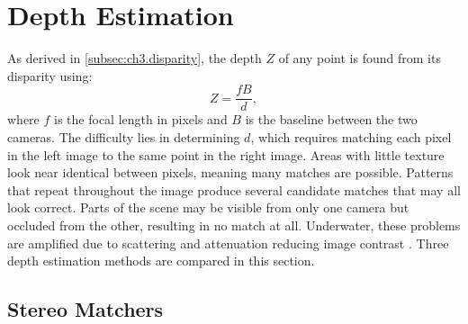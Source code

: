 \section{Depth Estimation}
\label{sec:ch5.stereo_depth}

As derived in \autoref{subsec:ch3.disparity}, the depth $Z$ of any point is found from its disparity using: 
\begin{equation}
    Z = \frac{fB}{d},
\end{equation}
where $f$ is the focal length in pixels and $B$ is the baseline between the two cameras.
The difficulty lies in determining $d$, which requires matching each pixel in the left image to the same point
in the right image. Areas with little texture look near identical between pixels, meaning many matches are possible. 
Patterns that repeat throughout the image produce several candidate matches that may all look correct. Parts of the scene may be visible from only one camera
but occluded from the other, resulting in no match at all. Underwater, these problems are amplified due to scattering and attenuation 
reducing image contrast \cite{roserSimultaneousUnderwaterVisibility2014}.
Three depth estimation methods are compared in this section. 

\subsection{Stereo Matchers}
\label{subsec:ch5.stereo_matchers}
